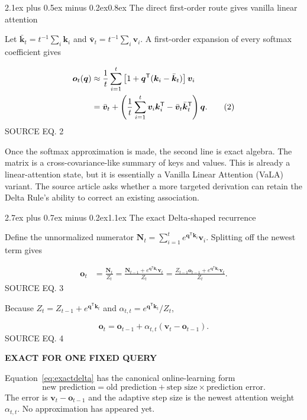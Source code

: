 \documentclass[11pt]{article}
\makeatletter
\newcommand{\vect}[1]{\bm{#1}}
\newcommand{\trans}{^{\mathsf T}}
\newcommand{\sourceeq}[1]{\hfill{\sffamily\scriptsize\color{Muted}SOURCE EQ. #1}}
\newenvironment{bluebox}[1]{%
  \def\FrameCommand{\fcolorbox{Blue}{BlueTint}}%
  \MakeFramed{\advance\hsize-\width\FrameRestore}%
  {\sffamily\bfseries\color{Blue}#1}\par\smallskip
}{\endMakeFramed}
\renewcommand\section{\@startsection{section}{1}{0pt}%
  {2.7ex plus 0.7ex minus 0.2ex}{1.1ex}%
  {\normalfont\sffamily\Large\bfseries\color{Ink}}}
\renewcommand\subsection{\@startsection{subsection}{2}{0pt}%
  {2.1ex plus 0.5ex minus 0.2ex}{0.8ex}%
  {\normalfont\sffamily\large\bfseries\color{Ink}}}
\makeatother
\begin{document}
\subsection{The direct first-order route gives vanilla linear attention}

Let $\bar{\vect k}_t=t^{-1}\sum_i\vect k_i$ and
$\bar{\vect v}_t=t^{-1}\sum_i\vect v_i$. A first-order expansion of every
softmax coefficient gives

\begin{align}
  \vect o_t(\vect q)
  &\approx \frac1t\sum_{i=1}^{t}
    \left[1+\vect q\trans(\vect k_i-\bar{\vect k}_t)\right]\vect v_i
    \notag\\
  &=\bar{\vect v}_t+
    \left(\frac1t\sum_{i=1}^{t}\vect v_i\vect k_i\trans
    -\bar{\vect v}_t\bar{\vect k}_t\trans\right)\vect q.
  \tag{2}\label{eq:vala}
\end{align}
\sourceeq{2}

Once the softmax approximation is made, the second line is exact algebra. The
matrix is a cross-covariance-like summary of keys and values. This is already a
linear-attention state, but it is essentially a Vanilla Linear Attention
(VaLA) variant. The source article asks whether a more targeted derivation can
retain the Delta Rule's ability to correct an existing association.

\section{The exact Delta-shaped recurrence}

Define the unnormalized numerator
$\vect N_t=\sum_{i=1}^{t}e^{\vect q\trans\vect k_i}\vect v_i$. Splitting off
the newest term gives

\begin{align}
  \vect o_t
  &=\frac{\vect N_t}{Z_t}
   =\frac{\vect N_{t-1}+e^{\vect q\trans\vect k_t}\vect v_t}{Z_t}
   =\frac{Z_{t-1}\vect o_{t-1}+e^{\vect q\trans\vect k_t}\vect v_t}{Z_t}.
  \tag{3}\label{eq:split}
\end{align}
\sourceeq{3}

Because $Z_t=Z_{t-1}+e^{\vect q\trans\vect k_t}$ and
$\alpha_{t,t}=e^{\vect q\trans\vect k_t}/Z_t$,

\begin{equation}
  \boxed{\vect o_t
  =\vect o_{t-1}
  +\alpha_{t,t}(\vect v_t-\vect o_{t-1})}.
  \tag{4}\label{eq:exactdelta}
\end{equation}
\sourceeq{4}

\begin{bluebox}{EXACT FOR ONE FIXED QUERY}
  Equation~\eqref{eq:exactdelta} has the canonical online-learning form
  \[
    \text{new prediction}
    =\text{old prediction}
    +\text{step size}\times\text{prediction error}.
  \]
  The error is $\vect v_t-\vect o_{t-1}$ and the adaptive step size is the
  newest attention weight $\alpha_{t,t}$. No approximation has appeared yet.
\end{bluebox}
\end{document}
